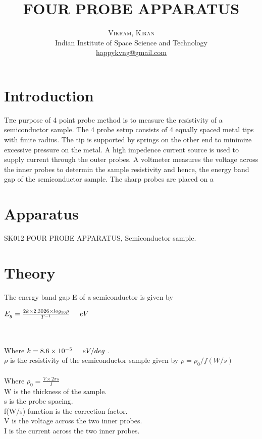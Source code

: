 \documentclass[twoside,twocolumn]{article}
\title{FOUR PROBE APPARATUS} %
\author{%
\textsc{Vikram, Kiran} \\ %
\normalsize Indian Institute of Space Science and Technology \\ %
\normalsize \href{mailto:happykvng@gmail.com}{happykvng@gmail.com} %
}
\date{} %
\begin{document}
\maketitle


\section{Introduction}

\lettrine[nindent=0em,lines=3]{T}he purpose of 4 point probe method is to measure the resistivity of a semiconductor sample. The 4 probe setup consists of 4 equally spaced metal tips with finite radius. The tip is supported by springs on the other end to minimize excessive pressure on the metal. A high impedence current source is used to supply current through the outer probes. A voltmeter measures the voltage across the inner probes to determin the sample resistivity and hence, the energy band gap of the semiconductor sample.
The sharp probes are placed on a 





\section{Apparatus}

SK012 FOUR PROBE APPARATUS, Semiconductor sample. 





\section{Theory}

The energy band gap E of a semiconductor is given by \\
\centerline{$ E_{g}  = \frac{2k \times  2.3026 \times log_{10}\rho }{T^{-1}} \hspace{0.5cm} eV $} \\
\\ 
Where $ k = 8.6 \times 10^{-5} \hspace{0.5cm} eV/deg$ .\\
$\rho$ is the resistivity of the semiconductor sample given by $\rho = \rho_{0} / f(W/s)$\\
\\
Where $\rho_{0} = \frac{V \times 2\pi s}{I}$\\
W is the thickness of the sample.\\ s is the probe spacing.\\ f(W/s) function is the correction factor.\\ V is the voltage across the two inner probes.\\ I is the current across the two inner probes.\\
\end{document}
